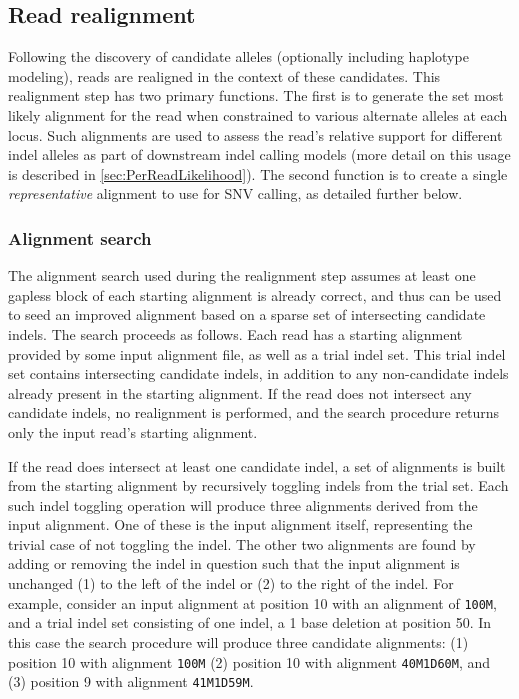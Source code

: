 \documentclass{article}
\begin{document}
\fi %


\subsection{Read realignment}
\label{sec:realignment}

Following the discovery of candidate alleles (optionally including haplotype modeling), reads are realigned in the context of these candidates. This realignment step has two primary functions. The first is to generate the set most likely alignment for the read when constrained to various alternate alleles at each locus. Such alignments are used to assess the read's relative support for different indel alleles as part of downstream indel calling models (more detail on this usage is described in \ref{sec:PerReadLikelihood}). The second function is to create a single \textit{representative} alignment to use for SNV calling, as detailed further below.

\subsubsection{Alignment search}
The alignment search used during the realignment step assumes at least one gapless block of each starting alignment is already correct, and thus can be used to seed an improved alignment based on a sparse set of intersecting candidate indels. The search proceeds as follows. Each read has a starting alignment provided by some input alignment file, as well as a trial indel set. This trial indel set contains intersecting candidate indels, in addition to any non-candidate indels already present in the starting alignment. If the read does not intersect any candidate indels, no realignment is performed, and the search procedure returns only the input read's starting alignment.

If the read does intersect at least one candidate indel, a set of alignments is built from the starting alignment by recursively toggling indels from the trial set. Each such indel toggling operation will produce three alignments derived from the input alignment. One of these is the input alignment itself, representing the trivial case of not toggling the indel. The other two alignments are found by adding or removing the indel in question such that the input alignment is unchanged (1) to the left of the indel or (2) to the right of the indel. For example, consider an input alignment at position 10 with an alignment of \texttt{100M}, and a trial indel set consisting of one indel, a 1 base deletion at position 50. In this case the search procedure will produce three candidate alignments: (1) position 10 with alignment \texttt{100M} (2) position 10 with alignment \texttt{40M1D60M}, and (3) position 9 with alignment \texttt{41M1D59M}.
\end{document}
